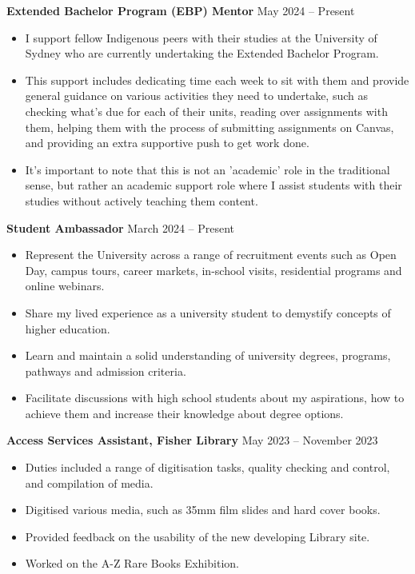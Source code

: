 \documentclass[11pt]{article}
\begin{document}
\textbf{Extended Bachelor Program (EBP) Mentor} \hfill May 2024 – Present
\begin{itemize}[noitemsep, topsep=0pt, partopsep=0pt, parsep=0pt]
    \item I support fellow Indigenous peers with their studies at the University of Sydney who are currently undertaking the Extended Bachelor Program.
    \item This support includes dedicating time each week to sit with them and provide general guidance on various activities they need to undertake, such as checking what's due for each of their units, reading over assignments with them, helping them with the process of submitting assignments on Canvas, and providing an extra supportive push to get work done. 
    \item It's important to note that this is not an 'academic' role in the traditional sense, but rather an academic support role where I assist students with their studies without actively teaching them content.
\end{itemize}

\textbf{Student Ambassador} \hfill March 2024 – Present
\begin{itemize}[noitemsep, topsep=0pt, partopsep=0pt, parsep=0pt]
    \item Represent the University across a range of recruitment events such as Open Day, campus tours, career markets, in-school visits, residential programs and online webinars.
    \item Share my lived experience as a university student to demystify concepts of higher education.
    \item Learn and maintain a solid understanding of university degrees, programs, pathways and admission criteria.
    \item Facilitate discussions with high school students about my aspirations, how to achieve them and increase their knowledge about degree options.
\end{itemize}

\textbf{Access Services Assistant, Fisher Library} \hfill May 2023 – November 2023
\begin{itemize}[noitemsep, topsep=0pt, partopsep=0pt, parsep=0pt]
    \item Duties included a range of digitisation tasks, quality checking and control, and compilation of media. 
    \item Digitised various media, such as 35mm film slides and hard
cover books.
    \item Provided feedback on the usability of the new developing Library site.
    \item Worked on the A-Z Rare Books Exhibition.
\end{itemize}
\end{document}
